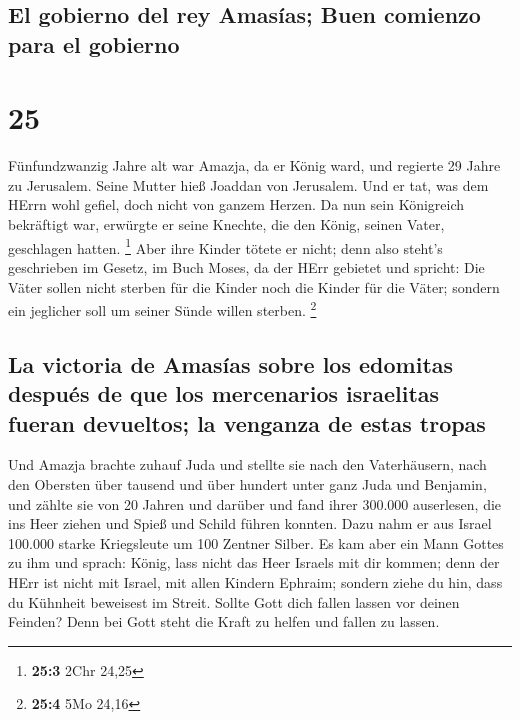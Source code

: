 \hypertarget{el-gobierno-del-rey-amasuxedas-buen-comienzo-para-el-gobierno}{%
\subsection{El gobierno del rey Amasías; Buen comienzo para el
gobierno}\label{el-gobierno-del-rey-amasuxedas-buen-comienzo-para-el-gobierno}}

\hypertarget{section-24}{%
\section{25}\label{section-24}}

 Fünfundzwanzig Jahre alt war Amazja, da er König ward,
und regierte 29 Jahre zu Jerusalem. Seine Mutter hieß Joaddan von
Jerusalem.  Und er tat, was dem HErrn wohl gefiel, doch
nicht von ganzem Herzen.  Da nun sein Königreich
bekräftigt war, erwürgte er seine Knechte, die den König, seinen Vater,
geschlagen hatten. \footnote{\textbf{25:3} 2Chr 24,25} 
Aber ihre Kinder tötete er nicht; denn also steht's geschrieben im
Gesetz, im Buch Moses, da der HErr gebietet und spricht: Die Väter
sollen nicht sterben für die Kinder noch die Kinder für die Väter;
sondern ein jeglicher soll um seiner Sünde willen sterben. \footnote{\textbf{25:4}
  5Mo 24,16}

\hypertarget{la-victoria-de-amasuxedas-sobre-los-edomitas-despuuxe9s-de-que-los-mercenarios-israelitas-fueran-devueltos-la-venganza-de-estas-tropas}{%
\subsection{La victoria de Amasías sobre los edomitas después de que los
mercenarios israelitas fueran devueltos; la venganza de estas
tropas}\label{la-victoria-de-amasuxedas-sobre-los-edomitas-despuuxe9s-de-que-los-mercenarios-israelitas-fueran-devueltos-la-venganza-de-estas-tropas}}

 Und Amazja brachte zuhauf Juda und stellte sie nach den
Vaterhäusern, nach den Obersten über tausend und über hundert unter ganz
Juda und Benjamin, und zählte sie von 20 Jahren und darüber und fand
ihrer 300.000 auserlesen, die ins Heer ziehen und Spieß und Schild
führen konnten.  Dazu nahm er aus Israel 100.000 starke
Kriegsleute um 100 Zentner Silber.  Es kam aber ein Mann
Gottes zu ihm und sprach: König, lass nicht das Heer Israels mit dir
kommen; denn der HErr ist nicht mit Israel, mit allen Kindern Ephraim;
 sondern ziehe du hin, dass du Kühnheit beweisest im
Streit. Sollte Gott dich fallen lassen vor deinen Feinden? Denn bei Gott
steht die Kraft zu helfen und fallen zu lassen.

